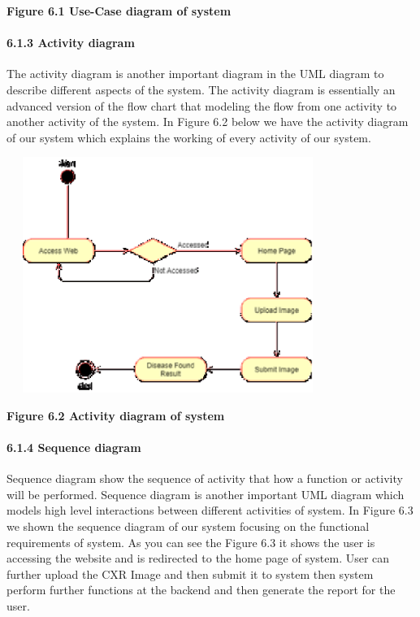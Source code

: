\documentclass{article} %
\begin{document}
\noindent \textbf{Figure 6.1 Use-Case diagram of system}

\noindent 
\paragraph{6.1.3 Activity diagram}

\noindent The activity diagram is another important diagram in the UML diagram to describe different aspects of the system. The activity diagram is essentially an advanced version of the flow chart that modeling the flow from one activity to another activity of the system. In Figure 6.2 below we have the activity diagram of our system which explains the working of every activity of our system.

\noindent \includegraphics*[width=4.14in, height=3.02in, keepaspectratio=false]{image29}

\noindent \textbf{Figure 6.2 Activity diagram of system}

\noindent 
\paragraph{6.1.4 Sequence diagram}

\noindent Sequence diagram show the sequence of activity that how a function or activity will be performed. Sequence diagram is another important UML diagram which models high level interactions between different activities of system. In Figure 6.3 we shown the sequence diagram of our system focusing on the functional requirements of system. As you can see the Figure 6.3 it shows the user is accessing the website and is redirected to the home page of system. User can further upload the CXR Image and then submit it to system then system perform further functions at the backend and then generate the report for the user.
\end{document}
